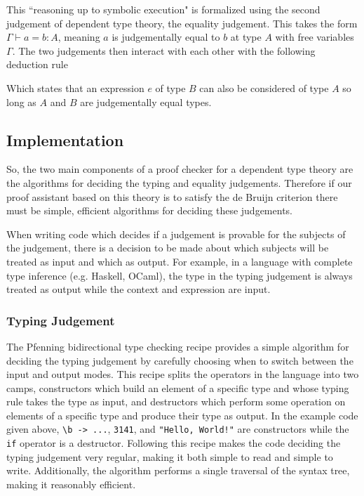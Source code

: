 \documentclass{article}
\begin{document}
This ``reasoning up to symbolic execution" is formalized using the second judgement of dependent type theory, the equality judgement.
This takes the form $\Gamma \vdash a = b : A$, meaning $a$ is judgementally equal to $b$ at type $A$ with free variables $\Gamma$.
The two judgements then interact with each other with the following deduction rule

\begin{mathpar}
\end{mathpar}

Which states that an expression $e$ of type $B$ can also be considered of type $A$ so long as $A$ and $B$ are judgementally equal types.

\subsection{Implementation}

So, the two main components of a proof checker for a dependent type theory are the algorithms for deciding the typing and equality judgements.
Therefore if our proof assistant based on this theory is to satisfy the de Bruijn criterion there must be simple, efficient algorithms for deciding these judgements.

When writing code which decides if a judgement is provable for the subjects of the judgement, there is a decision to be made about which subjects will be treated as input and which as output.
For example, in a language with complete type inference (e.g. Haskell, OCaml), the type in the typing judgement is always treated as output while the context and expression are input.

\subsubsection{Typing Judgement}

The Pfenning bidirectional type checking recipe \citep{Dunfield2021} provides a simple algorithm for deciding the typing judgement by carefully choosing when to switch between the input and output modes.
This recipe splits the operators in the language into two camps, constructors which build an element of a specific type and whose typing rule takes the type as input, and destructors which perform some operation on elements of a specific type and produce their type as output.
In the example code given above, \verb|\b -> ...|, \verb|3141|, and \verb|"Hello, World!"| are constructors while the \verb|if| operator is a destructor.
Following this recipe makes the code deciding the typing judgement very regular, making it both simple to read and simple to write.
Additionally, the algorithm performs a single traversal of the syntax tree, making it reasonably efficient.
\end{document}
